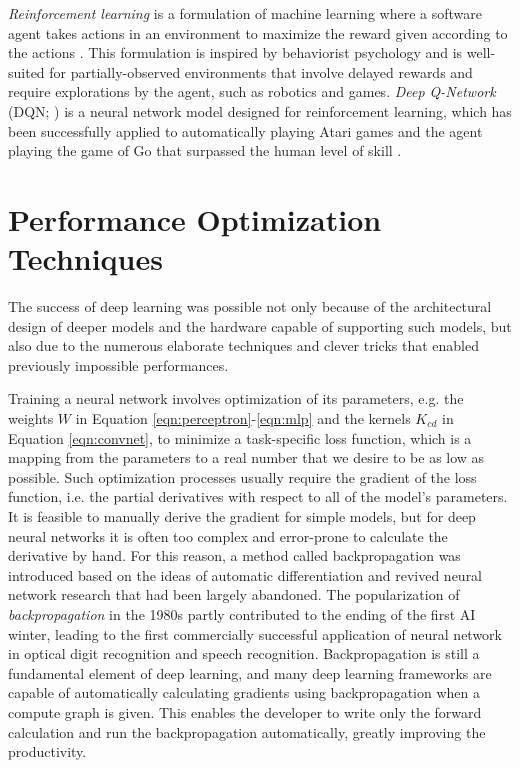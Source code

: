 \emph{Reinforcement learning} is a formulation of machine learning where a software agent takes actions in an environment to maximize the reward given according to the actions \cite{sutton2018reinforcement}.
This formulation is inspired by behaviorist psychology and is well-suited for partially-observed environments that involve delayed rewards and require explorations by the agent, such as robotics and games.
\emph{Deep Q-Network} (DQN; ) is a neural network model designed for reinforcement learning, which has been successfully applied to automatically playing Atari games \cite{mnih2013atari} and the agent playing the game of Go that surpassed the human level of skill \cite{silver2016alphago}.


\section{Performance Optimization Techniques}

The success of deep learning was possible not only because of the architectural design of deeper models and the hardware capable of supporting such models, but also due to the numerous elaborate techniques and clever tricks that enabled previously impossible performances.

Training a neural network involves optimization of its parameters, e.g. the weights $W$ in Equation \ref{eqn:perceptron}-\ref{eqn:mlp} and the kernels $K_{cd}$ in Equation \ref{eqn:convnet}, to minimize a task-specific loss function, which is a mapping from the parameters to a real number that we desire to be as low as possible.
Such optimization processes usually require the gradient of the loss function, i.e. the partial derivatives with respect to all of the model's parameters.
It is feasible to manually derive the gradient for simple models, but for deep neural networks it is often too complex and error-prone to calculate the derivative by hand.
For this reason, a method called backpropagation \cite{werbos1982backpropagation, rumelhart1986backpropagation} was introduced based on the ideas of automatic differentiation \cite{linnainmaa1970ad} and revived neural network research that had been largely abandoned.
The popularization of \emph{backpropagation} in the 1980s partly contributed to the ending of the first AI winter, leading to the first commercially successful application of neural network in optical digit recognition and speech recognition.
Backpropagation is still a fundamental element of deep learning, and many deep learning frameworks are capable of automatically calculating gradients using backpropagation when a compute graph is given.
This enables the developer to write only the forward calculation and run the backpropagation automatically, greatly improving the productivity.


